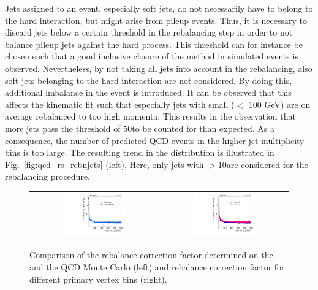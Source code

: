 Jets assigned to an event, especially soft jets, do not necessarily have to belong to the hard interaction, but might arise from pileup events. Thus, it is necessary to discard jets below a certain \pt threshold in the rebalancing step in order to not balance pileup jets against the hard process. This \pt threshold can for instance be chosen such that a good inclusive closure of the method in simulated events is observed. Nevertheless, by not taking all jets into account in the rebalancing, also soft jets belonging to the hard interaction are not considered. By doing this, additional imbalance in the event is introduced. It can be observed that this affects the kinematic fit such that especially jets with small \pt ($<$ 100 GeV) are on average rebalanced to too high momenta. This results in the observation that more jets pass the threshold of 50\gev to be counted for \NJets than expected. As a consequence, the number of predicted QCD events in the higher jet multiplicity bins is too large. The resulting trend in the \NJets distribution is illustrated in Fig.~\ref{fig:qcd_rs_rebnjets} (left). Here, only jets with \pt$> 10$\gev are considered for the rebalancing procedure.
\begin{figure}[!t]
  \centering
  \begin{tabular}{cc}
                \includegraphics[width=0.49\textwidth]{figures/RebalanceCorrectionFactors_DR53X_chsJets_TuneZ2star_withoutPUReweighting_pt10_vsRecoWithMadgraphComp.pdf} &
                \includegraphics[width=0.49\textwidth]{figures/RebalanceCorrectionFactors_DR53X_chsJets_TuneZ2star_withoutPUReweighting_pt10_vsRecoNVtxSplit.pdf}\\

  \end{tabular}
  \caption{Comparison of the rebalance correction factor determined on the \pythia and the \madgraph QCD Monte Carlo (left) and rebalance correction factor for different primary vertex bins (right).}
  \label{fig:qcd_rs_rebfactor}
\end{figure}
